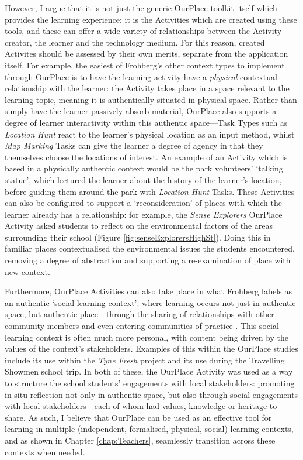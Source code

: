 However, I argue that it is not just the generic OurPlace toolkit itself which provides the learning experience: it is the Activities which are created using these tools, and these can offer a wide variety of relationships between the Activity creator, the learner and the technology medium. For this reason, created Activites should be assessed by their own merits, separate from the application itself. For example, the easiest of Frohberg's other context types to implement through OurPlace is to have the learning activity have a \textit{physical} contextual relationship with the learner: the Activity takes place in a space relevant to the learning topic, meaning it is authentically situated in physical space. Rather than simply have the learner passively absorb material, OurPlace also supports a degree of learner interactivity within this authentic space---Task Types such as \textit{Location Hunt} react to the learner's physical location as an input method, whilst \textit{Map Marking} Tasks can give the learner a degree of agency in that they themselves choose the locations of interest. An example of an Activity which is based in a physically authentic context would be the park volunteers' `talking statue', which lectured the learner about the history of the learner's location, before guiding them around the park with \textit{Location Hunt} Tasks. These Activities can also be configured to support a `reconsideration' of places with which the learner already has a relationship: for example, the \textit{Sense Explorers} OurPlace Activity asked students to reflect on the environmental factors of the areas surrounding their school (Figure \ref{fig:senseExplorersHighSt}). Doing this in familiar places contextualised the environmental issues the students encountered, removing a degree of abstraction and supporting a re-examination of place with new context.

Furthermore, OurPlace Activities can also take place in what Frohberg labels as an authentic `social learning context': where learning occurs not just in authentic space, but authentic place---through the sharing of relationships with other community members and even entering communities of practice \citep{lave1991situated}. This social learning context is often much more personal, with content being driven by the values of the context's stakeholders. Examples of this within the OurPlace studies include its use within the \textit{Tyne Fresh} project and its use during the Travelling Showmen school trip. In both of these, the OurPlace Activity was used as a way to structure the school students' engagements with local stakeholders: promoting in-situ reflection not only in authentic space, but also through social engagements with local stakeholders---each of whom had values, knowledge or heritage to share. As such, I believe that OurPlace can be used as an effective tool for learning in multiple (independent, formalised, physical, social) learning contexts, and as shown in Chapter \ref{chap:Teachers}, seamlessly transition across these contexts when needed.

